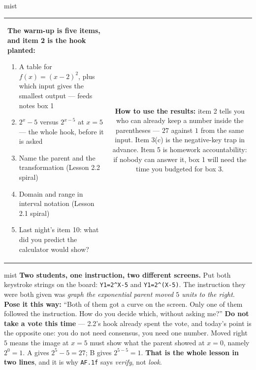 \documentclass[10pt]{article}
\begin{document}
\begin{fixedskillbox}{mist}
\begin{tabularx}{\linewidth}{@{}X c@{}}
\begin{minipage}[t]{0.55\linewidth}\vspace{0pt}
\textbf{The warm-up is five items, and item 2 is the hook planted:}
\begin{enumerate}[leftmargin=1.4em, itemsep=1pt, topsep=2pt]
  \item A table for $f(x)=(x-2)^2$, plus which input gives the smallest output --- feeds notes box 1
  \item $2^x-5$ versus $2^{x-5}$ at $x=5$ --- the whole hook, before it is asked
  \item Name the parent and the transformation (Lesson 2.2 spiral)
  \item Domain and range in interval notation (Lesson 2.1 spiral)
  \item Last night's item 10: what did you predict the calculator would show?
\end{enumerate}
\end{minipage}
&
\begin{minipage}[t]{0.38\linewidth}\vspace{0pt}
\textbf{How to use the results:} item 2 tells you who can already keep a number inside the
parentheses --- $27$ against $1$ from the same input. Item 3(c) is the negative-key trap in advance.
Item 5 is homework accountability: if nobody can answer it, box 1 will need the time you budgeted
for box 3.
\end{minipage}
\end{tabularx}
\end{fixedskillbox}

\begin{skillbox}[Hook]{mist}
\textbf{Two students, one instruction, two different screens.} Put both keystroke strings on the
board: \texttt{Y1=2\^{}X-5} and \texttt{Y1=2\^{}(X-5)}. The instruction they were both given was
\emph{graph the exponential parent moved $5$ units to the right}. \textbf{Pose it this way:} ``Both of
them got a curve on the screen. Only one of them followed the instruction. How do you decide which,
without asking me?'' \textbf{Do not take a vote this time} --- 2.2's hook already spent the vote, and
today's point is the opposite one: you do not need consensus, you need one number. Moved right $5$
means the image at $x=5$ must show what the parent showed at $x=0$, namely $2^0=1$. A gives
$2^5-5=27$; B gives $2^{5-5}=1$. \textbf{That is the whole lesson in two lines}, and it is why
\texttt{AF.1f} says \emph{verify}, not \emph{look}.
\end{skillbox}
\end{document}
